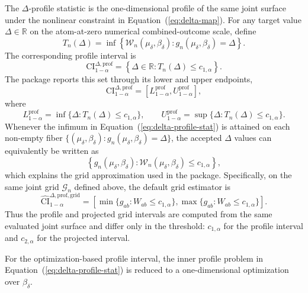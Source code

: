 \documentclass[11pt]{article}
\begin{document}
The $\Delta$-profile statistic is the one-dimensional profile of the same joint surface under the nonlinear constraint in Equation~(\ref{eq:delta-map}). For any target value $\Delta \in \mathbb{R}$ on the atom-at-zero numerical combined-outcome scale, define
\begin{equation}
  T_n(\Delta)
  =
  \inf
  \left\{
    \mathcal{W}_n(\mu_\delta,\beta_\delta)
    :
    g_n(\mu_\delta,\beta_\delta) = \Delta
  \right\}.
  \label{eq:delta-profile-stat}
\end{equation}
The corresponding profile interval is
\[
  \mathrm{CI}^{\Delta,\mathrm{prof}}_{1-\alpha}
  =
  \left\{
    \Delta \in \mathbb{R}
    :
    T_n(\Delta) \leq c_{1,\alpha}
  \right\}.
\]
The package reports this set through its lower and upper endpoints,
\[
  \mathrm{CI}^{\Delta,\mathrm{prof}}_{1-\alpha}
  =
  \left[
    L^{\mathrm{prof}}_{1-\alpha},
    U^{\mathrm{prof}}_{1-\alpha}
  \right],
\]
where
\[
  L^{\mathrm{prof}}_{1-\alpha}
  =
  \inf\{\Delta : T_n(\Delta) \leq c_{1,\alpha}\},
  \qquad
  U^{\mathrm{prof}}_{1-\alpha}
  =
  \sup\{\Delta : T_n(\Delta) \leq c_{1,\alpha}\}.
\]
Whenever the infimum in Equation~(\ref{eq:delta-profile-stat}) is attained on each non-empty fiber $\{(\mu_\delta,\beta_\delta): g_n(\mu_\delta,\beta_\delta) = \Delta\}$, the accepted $\Delta$ values can equivalently be written as
\[
  \left\{
    g_n(\mu_\delta,\beta_\delta)
    :
    \mathcal{W}_n(\mu_\delta,\beta_\delta) \leq c_{1,\alpha}
  \right\},
\]
which explains the grid approximation used in the package. Specifically, on the same joint grid $\mathcal{G}_n$ defined above, the default grid estimator is
\[
  \widehat{\mathrm{CI}}^{\Delta,\mathrm{prof,grid}}_{1-\alpha}
  =
  \left[
    \min\{g_{ab} : W_{ab} \leq c_{1,\alpha}\},
    \max\{g_{ab} : W_{ab} \leq c_{1,\alpha}\}
  \right].
\]
Thus the profile and projected grid intervals are computed from the same evaluated joint surface and differ only in the threshold: $c_{1,\alpha}$ for the profile interval and $c_{2,\alpha}$ for the projected interval.

For the optimization-based profile interval, the inner profile problem in Equation~(\ref{eq:delta-profile-stat}) is reduced to a one-dimensional optimization over $\beta_\delta$.
\end{document}
